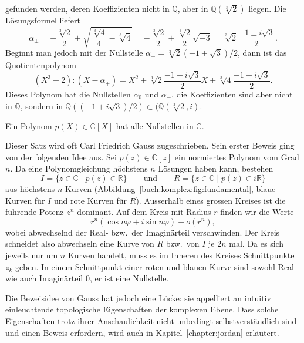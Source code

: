 \begin{beispiel}
\[\]
gefunden werden, deren Koeffizienten nicht in $\mathbb{Q}$, aber in
$\mathbb{Q}(\!\sqrt[3]{2})$ liegen.
Die Lösungsformel liefert
\[
\alpha_\pm
=
-
\frac{\!\sqrt[3]{2}}2 \pm \!\sqrt{
\frac{\!\sqrt[3]{4}}{4} - \!\sqrt[3]{4}
}
=
-
\frac{\!\sqrt[3]{2}}2 \pm
\frac{\!\sqrt[3]{2}}{2}
\!\sqrt{-3}
=
\!\sqrt[3]{2}
\frac{-1\pm i\!\sqrt{3}}2.
\]
Beginnt man jedoch mit der Nullstelle $\alpha_+= \sqrt[3]{2}(-1+\!\sqrt{3})/2$,
dann ist das Quotientenpolynom
\[
(X^3-2) : (X-\alpha_+)
=
X^2
+
\!\sqrt[3]{2}\frac{-1+i\!\sqrt{3}}{2} X
+
\!\sqrt[3]{4}\frac{-1-i\!\sqrt{3}}2.
\]
Dieses Polynom hat die Nullstellen $\alpha_0$ und $\alpha_-$,
die Koeffizienten sind aber nicht in $\mathbb{Q}$, sondern in
$\mathbb{Q}((-1+i\!\sqrt{3})/2)\subset(\mathbb{Q}(\!\sqrt[3]{2},i)$.
\end{beispiel}

\begin{satz}
Ein Polynom $p(X)\in \mathbb{C}[X]$ hat alle Nullstellen in $\mathbb{C}$.
\end{satz}

%

Dieser Satz wird oft Carl Friedrich Gauss zugeschrieben.
%
Sein erster Beweis ging von der folgenden Idee aus.
Sei $p(z)\in \mathbb{C}[z]$ ein normiertes Polynom vom Grad $n$.
Da eine Polynomgleichung höchstens $n$ Lösungen haben kann,
bestehen
\[
I=\{z\in\mathbb{C} \mid p(z) \in \mathbb{R} \}
\qquad\text{und}\qquad
R=\{z\in\mathbb{C} \mid p(z) \in i\mathbb{R} \}
\]
aus höchstens $n$ Kurven (Abbildung~\ref{buch:komplex:fig:fundamental},
blaue Kurven für $I$ und rote Kurven für $R$).
Ausserhalb eines grossen Kreises ist die führende Potenz $z^n$ dominant.
Auf dem Kreis mit Radius $r$ finden wir die Werte
\[
r^n (\cos n\varphi + i \sin n\varphi) + o(r^n),
\]
wobei abwechselnd der Real- bzw.~der Imaginärteil verschwinden.
Der Kreis schneidet also abwechseln eine Kurve von $R$ bzw.~von $I$
je $2n$ mal.
Da es sich jeweils nur um $n$ Kurven handelt, muss es im Inneren des
Kreises Schnittpunkte $z_k$ geben.
In einem Schnittpunkt einer roten und blauen Kurve sind sowohl 
Real- wie auch Imaginärteil $0$, er ist eine Nullstelle.

Die Beweisidee von Gauss hat jedoch eine Lücke: sie appelliert an 
intuitiv einleuchtende topologische Eigenschaften der komplexen
Ebene.
Dass solche Eigenschaften trotz ihrer Anschaulichkeit
nicht unbedingt selbstverständlich sind und einen Beweis erfordern,
wird auch in Kapitel~\ref{chapter:jordan} erläutert.

